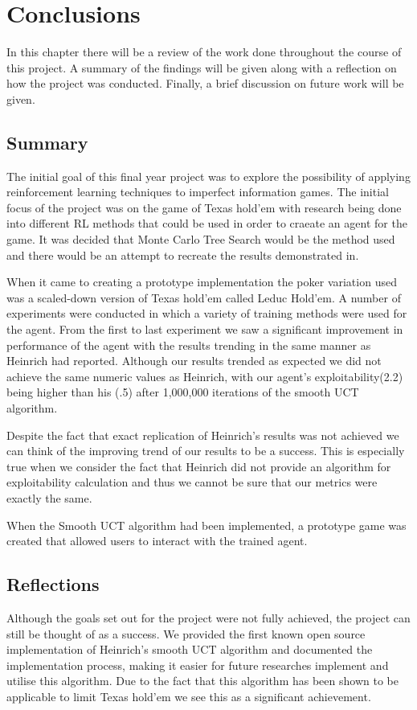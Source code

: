 \chapter{Conclusions}\label{ch:conclusions}
In this chapter there will be a review of the work done throughout the course of this project.
A summary of the findings will be given along with a reflection on how the project was conducted.
Finally, a brief discussion on future work will be given.

\section{Summary}\label{sec:summary}
The initial goal of this final year project was to explore the possibility of applying
reinforcement learning techniques to imperfect information games.
The initial focus of the project was on the game of Texas hold'em with research being
done into different RL methods that could be used in order to craeate an agent for the game.
It was decided that Monte Carlo Tree Search would be the method used and there would be
an attempt to recreate the results demonstrated in\citep{heinrich2017reinforcement}.

When it came to creating a prototype implementation the poker variation used was a
scaled-down version of Texas hold'em called Leduc Hold'em.
A number of experiments were conducted in which a variety of training methods were used
for the agent.
From the first to last experiment we saw a significant improvement in performance of the
agent with the results trending in the same manner as Heinrich had reported.
Although our results trended as expected we did not achieve the same numeric values as Heinrich,
with our agent's exploitability(2.2) being higher than his (.5) after 1,000,000
iterations of the smooth UCT algorithm.

Despite the fact that exact replication of Heinrich's results was not achieved we can
think of the improving trend of our results to be a success.
This is especially true when we consider the fact that Heinrich did not provide
an algorithm for exploitability calculation and thus we cannot be sure that our metrics
were exactly the same.

When the Smooth UCT algorithm had been implemented, a prototype game was created that
allowed users to interact with the trained agent.

\section{Reflections}\label{sec:reflections}
Although the goals set out for the project were not fully achieved, the project can
still be thought of as a success.
We provided the first known open source implementation of Heinrich's smooth UCT algorithm and
documented the implementation process, making it easier for future researches implement and
utilise this algorithm.
Due to the fact that this algorithm has been shown to be applicable to limit Texas hold'em\citep{heinrich2015smooth}
we see this as a significant achievement.

